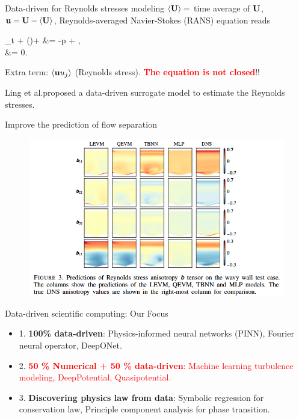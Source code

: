 \documentclass{beamer}
\begin{document}
\begin{frame}{Data-driven for Reynolds stresses modeling}
	$\left\langle \mathbf{U} \right\rangle =$ time average of $\mathbf{U}$, $\mathbf{u} = \mathbf{U} - \left\langle \mathbf{U} \right\rangle$, Reynolds-averaged Navier-Stokes (RANS) equation reads
	\bequ
		\begin{aligned}
	\p_t \la \mfU \ra + (\la \mfU \ra \cdot \nabla)\la \mfU \ra +  &= -\nabla p + \nu \Delta \la \mfU \ra,		\\
	\nabla \cdot \la \mfU \ra &= 0.
	\end{aligned}
\eequ
Extra term: $\left\langle \mathbf{u} u_j \right\rangle$ (Reynolds stress). \textcolor{red}{\textbf{The equation is not closed}}!!
\par
Ling et al.\footnotemark proposed a data-driven surrogate model to estimate the Reynolds stresses.
\end{frame}


\begin{frame}{Improve the prediction of flow separation}
	\begin{figure}[H]
          \centering
          \centerline{\includegraphics[width=\linewidth]{fig/tbnn.png}}
        \end{figure}
\end{frame}


\begin{frame}{Data-driven scientific computing: Our Focus}
	\begin{itemize}
		\item 1. \textbf{100\% data-driven}: Physics-informed neural networks (PINN), Fourier neural operator, DeepONet.
		\item 2. \textcolor{red}{\textbf{50 \% Numerical + 50 \% data-driven}: Machine learning turbulence modeling, DeepPotential, Quasipotential.} 
		\item 3. \textbf{Discovering physics law from data}: Symbolic regression for conservation law, Principle component analysis for phase transition.
	\end{itemize}
\end{frame}
\end{document}

